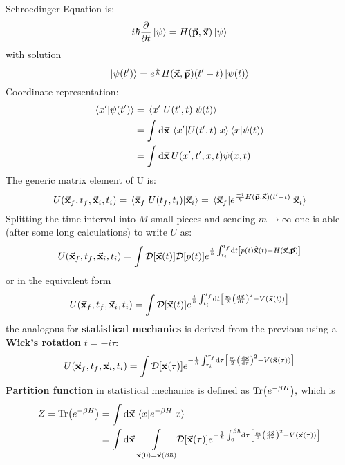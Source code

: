 \documentclass[a4paper]{article}
\begin{document}
Schroedinger Equation is:
\begin{equation}
  i\hbar\pdv{t}\ket{\psi}=H(\va{p}, \va{x})\ket{\psi}
\end{equation}
with solution
\begin{equation}
  \ket{\psi(t')}= e^{\frac{i}{\hbar}}H(\va{x},\va{p})(t'-t)\ket{\psi(t)}
\end{equation}
Coordinate representation:
\begin{align}
  \braket{x'}{\psi(t')}&=\mel{x'}{U(t',t)}{\psi(t)}\\
& =\int \dd{\va{x}}\mel{x'}{U(t',t)}{x}\braket{x}{\psi(t)}\\
&= \int \dd{\va{x}} U(x',t',x,t)\psi(x,t)
\end{align}
The generic matrix element of U is:
\begin{equation}
  U(\va{x}_f, t_f,\va{x}_i, t_i)= \mel{\va{x}_f}{U(t_f,t_i)}{\va{x}_i} = \mel{\va{x}_f}{e^{\frac{-i}{\hbar}H(\va{p},\va{x})(t'-t)}}{\va{x}_i}
\end{equation}
Splitting the time interval into $M$ small pieces and sending $m\to\infty$ one is able (after some long calculations) to write $U$ as:
\begin{equation}
  U(\va{x}_f,t_f,\va{x}_i,t_i) = \int \mathcal{D}\bqty{\va{x}(t)}\mathcal{D}\bqty{p(t)}e^{\frac{i}{\hbar}\int_{t_i}^{t_f}\dd{t}\bqty{p(t)\dot{\va{x}}(t) - H(\va{x},\va{p})}}
\end{equation}
or in the equivalent form
\begin{equation}
  U(\va{x}_f,t_f,\va{x}_i,t_i) = \int \mathcal{D}\bqty{\va{x}(t)}e^{\frac{i}{\hbar}\int_{t_i}^{t_f}\dd{t}\bqty{\frac{m}{2}\pqty{\dv{\va{x}}{t}}^2 - V(\va{x}(t))}}
\end{equation}
the analogous for \textbf{statistical mechanics} is derived from the previous using a \textbf{Wick's rotation} $t=-i\tau:$
\begin{equation}
  U(\va{x}_f,t_f,\va{x}_i,t_i) = \int \mathcal{D}\bqty{\va{x}(\tau)}e^{-\frac{1}{\hbar}\int_{\tau_i}^{\tau_f}\dd{\tau}\bqty{\frac{m}{2}\pqty{\dv{\va{x}}{\tau}}^2 - V(\va{x}(\tau))}}
\end{equation}
\textbf{Partition  function} in statistical mechanics is defined as $\Tr(e^{-\beta H}),$ which is
\begin{align}
  Z = \Tr(e^{-\beta H}) &= \int \dd{\va{x}}\ev{e^{-\beta H}}{x}\\
&= \int \dd{\va{x}}\underset{\va{x}(0) = \va{x}(\beta\hbar)}{\int} \mathcal{D}\bqty{\va{x}(\tau)}e^{-\frac{1}{\hbar}\int_{0}^{\beta\hbar}\dd{\tau}\bqty{\frac{m}{2}\pqty{\dv{\va{x}}{\tau}}^2 - V(\va{x}(\tau))}}
 \end{align}
\end{document}
